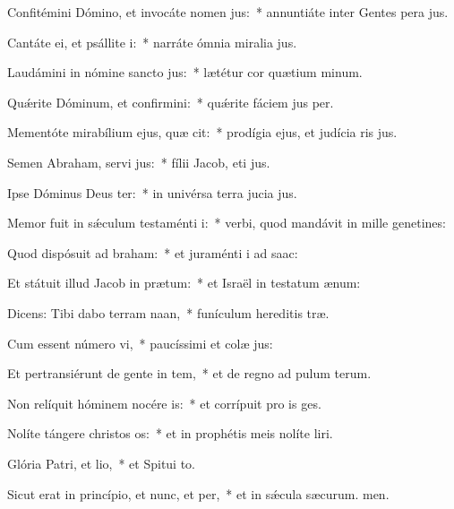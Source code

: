 \item Confitémini Dómino, et invocáte nomen jus:~* annuntiáte inter Gentes pera jus.
\item Cantáte ei, et psállite i:~* narráte ómnia miralia jus.
\item Laudámini in nómine sancto jus:~* lætétur cor quætium minum.
\item Quǽrite Dóminum, et confirmini:~* quǽrite fáciem jus per.
\item Mementóte mirabílium ejus, quæ cit:~* prodígia ejus, et judícia ris jus.
\item Semen Abraham, servi jus:~* fílii Jacob, eti jus.
\item Ipse Dóminus Deus ter:~* in univérsa terra jucia jus.
\item Memor fuit in sǽculum testaménti i:~* verbi, quod mandávit in mille genetines:
\item Quod dispósuit ad braham:~* et juraménti i ad saac:
\item Et státuit illud Jacob in prætum:~* et Israël in testatum ænum:
\item Dicens: Tibi dabo terram naan,~* funículum hereditis træ.
\item Cum essent número vi,~* paucíssimi et colæ jus:
\item Et pertransiérunt de gente in tem,~* et de regno ad pulum terum.
\item Non relíquit hóminem nocére is:~* et corrípuit pro is ges.
\item Nolíte tángere christos os:~* et in prophétis meis nolíte liri.
\item Glória Patri, et lio,~* et Spitui to.
\item Sicut erat in princípio, et nunc, et per,~* et in sǽcula sæcurum. men.
